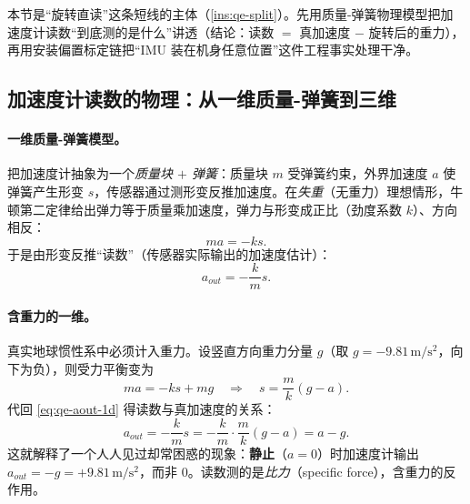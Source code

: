 本节是“旋转直读”这条短线的主体（\cref{ins:qe-split}）。先用质量-弹簧物理模型把加速度计读数“到底测的是什么”讲透（结论：读数 $=$ 真加速度 $-$ 旋转后的重力），再用安装偏置标定链把“IMU 装在机身任意位置”这件工程事实处理干净。

\subsection{加速度计读数的物理：从一维质量-弹簧到三维}
\label{subsec:qe-imu-physics}

\paragraph{一维质量-弹簧模型。}
把加速度计抽象为一个\emph{质量块 $+$ 弹簧}：质量块 $m$ 受弹簧约束，外界加速度 $a$ 使弹簧产生形变 $s$，传感器通过测形变反推加速度\cite{unitree2023quadruped}。在\emph{失重}（无重力）理想情形，牛顿第二定律给出弹力等于质量乘加速度，弹力与形变成正比（劲度系数 $k$）、方向相反：
\begin{equation}
  m a = -k s.
  \label{eq:qe-massspring-1d}
\end{equation}
于是由形变反推“读数”（传感器实际输出的加速度估计）：
\begin{equation}
  a_{out} = -\frac{k}{m}s.
  \label{eq:qe-aout-1d}
\end{equation}

\paragraph{含重力的一维。}
真实地球惯性系中必须计入重力。设竖直方向重力分量 $g$（取 $g=-9.81\,\mathrm{m/s^2}$，向下为负），则受力平衡变为
\begin{equation}
  m a = -k s + m g
  \quad\Longrightarrow\quad
  s = \frac{m}{k}(g - a).
  \label{eq:qe-massspring-1d-g}
\end{equation}
代回 \cref{eq:qe-aout-1d} 得读数与真加速度的关系\cite{unitree2023quadruped}：
\begin{equation}
  a_{out} = -\frac{k}{m}s = -\frac{k}{m}\cdot\frac{m}{k}(g-a) = a - g.
  \label{eq:qe-aout-1d-g}
\end{equation}
这就解释了一个人人见过却常困惑的现象：\textbf{静止}（$a=0$）时加速度计输出 $a_{out}=-g=+9.81\,\mathrm{m/s^2}$，而非 $0$。读数测的是\emph{比力}（specific force），含重力的反作用。

